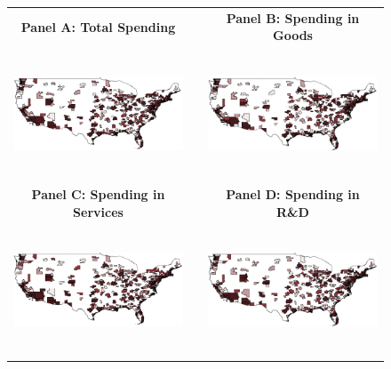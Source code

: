 \documentclass[dv_diss_main.tex]{subfiles}
\begin{document}
\begin{figure}[H]
\begin{center}
    \begin{tabular}[c]{ccc}
    
    \normalsize{\bf Panel A: Total Spending} & & \normalsize{\bf Panel B: Spending in Goods} \\
    {\includegraphics[height=1.5in,width=2.8in]{figures/map_cbsa_totspend.png}} & & {\includegraphics[height=1.5in,width=2.8in]{figures/map_cbsa_goodsspend.png}} \\[0.1in]
    
    \normalsize{\bf Panel C: Spending in Services} & & \normalsize{\bf Panel D: Spending in R\&D} \\
    {\includegraphics[height=1.5in,width=2.8in]{figures/map_cbsa_servicesspend.png}} & & {\includegraphics[height=1.5in,width=2.8in]{figures/map_cbsa_rdspend.png}} \\[0.1in]
    

\end{tabular}
\end{center}
\end{figure}
\end{document}
